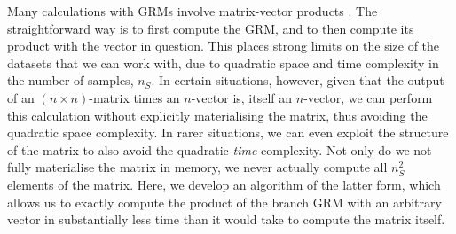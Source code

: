 

Many calculations with GRMs involve matrix-vector products
\citep{colleau2002indirect, colleau2017fast}. The straightforward way is
to first compute the GRM, and to then compute its product with 
the vector in question. This places strong limits on the size of the 
datasets that we can work with, due to quadratic space and time complexity
in the number of samples, $n_S$. In certain situations, however, 
given that the output of an $(n\times n)$-matrix times an $n$-vector is,
itself an $n$-vector, we can perform this calculation without explicitly
materialising the matrix, thus avoiding the quadratic space complexity.
In rarer situations, we can even exploit the structure of the matrix to 
also avoid the quadratic \emph{time} complexity. Not only do we not fully
materialise the matrix in memory, we never actually compute all $n_S^2$
elements of the matrix. Here, we develop an algorithm of the 
latter form, which allows us to exactly compute the product of the 
branch GRM with an arbitrary vector in substantially less time than
it would take to compute the matrix itself.

